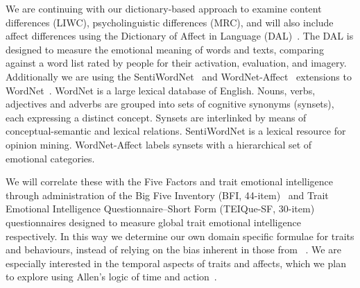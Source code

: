 \documentclass[letterpaper]{article}
\begin{document}
We are continuing with our dictionary-based approach to examine
content differences (LIWC), psycholinguistic differences (MRC), and
will also include affect differences using the Dictionary of Affect in
Language (DAL)~\cite{whissell:2008,whissell:2009}. The DAL is designed
to measure the emotional meaning of words and texts, comparing against
a word list rated by people for their activation, evaluation, and
imagery. Additionally we are using the
SentiWordNet~\cite{esuli+sebastiani:2006} and
WordNet-Affect~\cite{strapparava+valitutti:2004} extensions to
WordNet~\cite{miller:1995}. WordNet is a large lexical database of
English. Nouns, verbs, adjectives and adverbs are grouped into sets of
cognitive synonyms (synsets), each expressing a distinct
concept. Synsets are interlinked by means of conceptual-semantic and
lexical relations. SentiWordNet is a lexical resource for opinion
mining. WordNet-Affect labels synsets with a hierarchical set of
emotional categories.

We will correlate these with the Five Factors and trait emotional
intelligence~\cite{petrides+furnham:2001} through administration of
the Big Five Inventory (BFI, 44-item)~\cite{john-et-al:1991} and Trait
Emotional Intelligence Questionnaire--Short Form (TEIQue-SF, 30-item)
questionnaires designed to measure global trait emotional
intelligence~\cite{petrides+furnham:2006} respectively. In this way we
determine our own domain specific formulae for traits and behaviours,
instead of relying on the bias inherent in those from
\citeauthor{mairesse-et-al:2007}~. We
are especially interested in the temporal aspects of traits and
affects, which we plan to explore using Allen's logic of time and
action~\cite{allen:1983,allen:1984}.



\end{document}
